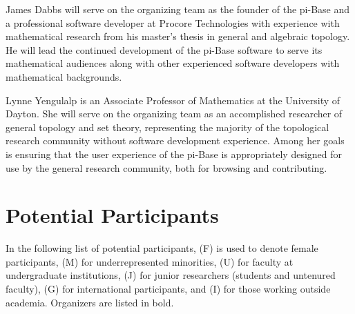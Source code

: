 \documentclass{amsart}
\newcommand{\TODO}[1]{\textcolor{red}{(TODO: #1)}}
\begin{document}
James Dabbs will serve on the organizing team as the founder of the pi-Base
and a professional software developer at Procore Technologies 
with experience with mathematical
research from his master's thesis in general and algebraic topology.
He will lead the continued development of the pi-Base software to
serve its mathematical audiences along with other experienced software
developers with mathematical backgrounds.

Lynne Yengulalp is an Associate Professor of Mathematics at the
University of Dayton. She will serve on the organizing team as an accomplished researcher
of general topology and set theory, representing the majority of
the topological research community without software development experience.
Among her goals is ensuring
that the user experience of the pi-Base is appropriately designed for
use by the general research community, both for browsing and contributing.


\section{Potential Participants}

In the following list of potential participants, (F) is used to denote
female participants, (M) for underrepresented minorities, (U) for
faculty at undergraduate institutions, (J) for junior researchers
(students and untenured faculty), (G) for international participants, 
and (I) for those working
outside academia. Organizers are listed in bold.
\end{document}
